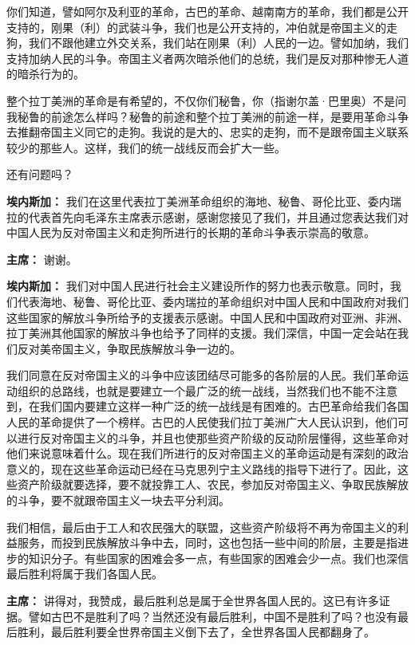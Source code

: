 \begin{list}{}
你们知道，譬如阿尔及利亚的革命，古巴的革命、越南南方的革命，我们都是公开支持的，刚果（利）的武装斗争，我们也是公开支持的，冲伯就是帝国主义的走狗，我们不跟他建立外交关系，我们站在刚果（利）人民的一边。譬如加纳，我们支持加纳人民的斗争。帝国主义者两次暗杀他们的总统，我们是反对那种惨无人道的暗杀行为的。

整个拉丁美洲的革命是有希望的，不仅你们秘鲁，你（指谢尔盖·巴里奥）不是问我秘鲁的前途怎么样吗？秘鲁的前途和整个拉丁美洲的前途一样，是要用革命斗争去推翻帝国主义同它的走狗。我说的是大的、忠实的走狗，而不是跟帝国主义联系较少的那些人。这样，我们的统一战线反而会扩大一些。

还有问题吗？

\item[\textbf{埃内斯加：}] 我们在这里代表拉丁美洲革命组织的海地、秘鲁、哥伦比亚、委内瑞拉的代表首先向毛泽东主席表示感谢，感谢您接见了我们，并且通过您表达我们对中国人民为反对帝国主义和走狗所进行的长期的革命斗争表示崇高的敬意。

\item[\textbf{主席：}] 谢谢。

\item[\textbf{埃内斯加：}] 我们对中国人民进行社会主义建设所作的努力也表示敬意。同时，我们代表海地、秘鲁、哥伦比亚、委内瑞拉的革命组织对中国人民和中国政府对我们这些国家的解放斗争所给予的支援表示感谢。中国人民和中国政府对亚洲、非洲、拉丁美洲其他国家的解放斗争也给予了同样的支援。我们深信，中国一定会站在我们反对美帝国主义，争取民族解放斗争一边的。

我们同意在反对帝国主义的斗争中应该团结尽可能多的各阶层的人民。我们革命运动组织的总路线，也就是要建立一个最广泛的统一战线，当然我们也不能不注意到，在我们国内要建立这样一种广泛的统一战线是有困难的。古巴革命给我们各国人民的革命提供了一个榜样。古巴的人民使我们拉丁美洲广大人民认识到，他们可以进行反对帝国主义的斗争，并且也使那些资产阶级的反动阶层懂得，这些革命对他们来说意味着什么。现在我们所进行的反对帝国主义的革命运动是有深刻的政治意义的，现在这些革命运动已经在马克思列宁主义路线的指导下进行了。因此，这些资产阶级就要选择，要不就投靠工人、农民，参加反对帝国主义、争取民族解放的斗争，要不就跟帝国主义一块去平分利润。

我们相信，最后由于工人和农民强大的联盟，这些资产阶级将不再为帝国主义的利益服务，而投到民族解放斗争中去，同时，这也包括一些中间的阶层，主要是指进步的知识分子。有些国家的困难会多一点，有些国家的困难会少一点。我们也深信最后胜利将属于我们各国人民。

\item[\textbf{主席：}] 讲得对，我赞成，最后胜利总是属于全世界各国人民的。这已有许多证据。譬如古巴不是胜利了吗？当然还没有最后胜利，中国不是胜利了吗？也没有最后胜利，最后胜利要全世界帝国主义倒下去了，全世界各国人民都翻身了。


\end{list}
